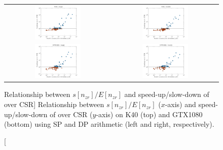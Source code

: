 \begin{figure}[t]
\begin{tabular}{cc}
\includegraphics[width=0.45\textwidth]{plots/std_speedup_K40_single.pdf} &
\includegraphics[width=0.45\textwidth]{plots/std_speedup_K40_double.pdf}\\
\includegraphics[width=0.45\textwidth]{plots/std_speedup_GTX1080_single.pdf} &
\includegraphics[width=0.45\textwidth]{plots/std_speedup_GTX1080_double.pdf}
\end{tabular}
\caption
    [{Relationship between $s[n_{zr}]/E[n_{zr}]$
    and speed-up/slow-down of \bcsr over CSR}]
    {Relationship between $s[n_{zr}]/E[n_{zr}]$ ($x$-axis)
    and speed-up/slow-down of \bcsr over CSR ($y$-axis)
    on K40 (top) and GTX1080 (bottom)
    using SP and DP arithmetic (left and right, respectively).}
\label{2017-csr-spmv:fig:deviation}
\end{figure}

